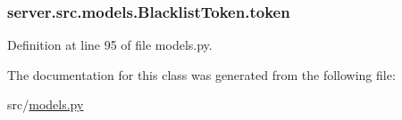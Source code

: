 \subsubsection[{\texorpdfstring{token}{token}}]{\setlength{\rightskip}{0pt plus 5cm}server.\+src.\+models.\+Blacklist\+Token.\+token}\hypertarget{classserver_1_1src_1_1models_1_1_blacklist_token_abaecaf1295a403b0076f0e697b039446}{}\label{classserver_1_1src_1_1models_1_1_blacklist_token_abaecaf1295a403b0076f0e697b039446}


Definition at line 95 of file models.\+py.



The documentation for this class was generated from the following file\+:\begin{DoxyCompactItemize}
\item 
src/\hyperlink{models_8py}{models.\+py}\end{DoxyCompactItemize}
